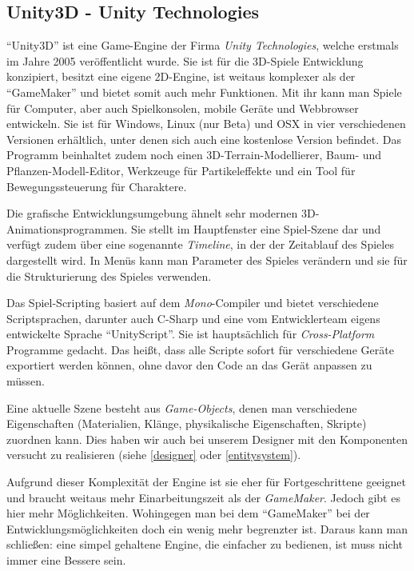\subsection{Unity3D - Unity Technologies}

"`Unity3D"' ist eine Game-Engine der Firma \textit{Unity Technologies}, welche erstmals im Jahre 2005 veröffentlicht wurde. Sie ist für die 3D-Spiele Entwicklung konzipiert, besitzt eine eigene 2D-Engine, ist weitaus komplexer als der "`GameMaker"' und bietet somit auch mehr Funktionen. 
Mit ihr kann man Spiele für Computer, aber auch Spielkonsolen, mobile Geräte und Webbrowser entwickeln. Sie ist für Windows, Linux (nur Beta) und OSX in vier verschiedenen Versionen erhältlich, unter denen sich auch eine kostenlose Version befindet. Das Programm beinhaltet zudem noch einen 3D-Terrain-Modellierer, Baum- und Pflanzen-Modell-Editor, Werkzeuge für Partikeleffekte und ein Tool für Bewegungssteuerung für Charaktere.

Die grafische Entwicklungsumgebung ähnelt sehr modernen 3D-Animationsprogrammen. Sie stellt im Hauptfenster eine Spiel-Szene dar und verfügt zudem über eine sogenannte \textit{Timeline}, in der der Zeitablauf des Spieles dargestellt wird. In Menüs kann man Parameter des Spieles verändern und sie für die Strukturierung des Spieles verwenden. 

Das Spiel-Scripting basiert auf dem \textit{Mono}-Compiler und bietet verschiedene Scriptsprachen, darunter auch C-Sharp und eine vom Entwicklerteam eigens entwickelte Sprache "`UnityScript"'. Sie ist hauptsächlich für \textit{Cross-Platform} Programme gedacht. Das heißt, dass alle Scripte sofort für verschiedene Geräte exportiert werden können, ohne davor den Code an das Gerät anpassen zu müssen.

Eine aktuelle Szene besteht aus \textit{Game-Objects}, denen man verschiedene Eigenschaften (Materialien, Klänge, physikalische Eigenschaften, Skripte) zuordnen kann. Dies haben wir auch bei unserem Designer mit den Komponenten versucht zu realisieren (siehe \cref{designer} oder \cref{entitysystem}).

Aufgrund dieser Komplexität der Engine ist sie eher für Fortgeschrittene geeignet und braucht weitaus mehr Einarbeitungszeit als der \textit{GameMaker}. Jedoch gibt es hier mehr Möglichkeiten. Wohingegen man bei dem "`GameMaker"' bei der Entwicklungsmöglichkeiten doch ein wenig mehr begrenzter ist.
Daraus kann man schließen: eine simpel gehaltene Engine, die einfacher zu bedienen, ist muss nicht immer eine Bessere sein.
